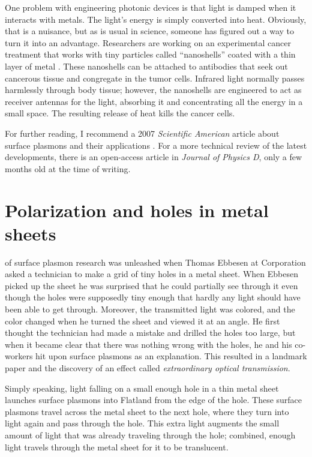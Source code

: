 One problem with engineering photonic devices is that light is damped when it interacts with metals.
The light's energy is simply converted into heat.
Obviously, that is a nuisance, but as is usual in science, someone has figured out a way to turn it into an advantage.
Researchers are working on an experimental cancer treatment that works with tiny particles called ``nanoshells'' coated with a thin layer of metal \cite{Loo2005}.
These nanoshells can be attached to antibodies that seek out cancerous tissue and congregate in the tumor cells.
Infrared light normally passes harmlessly through body tissue; however, the nanoshells are engineered to act as receiver antennas for the light, absorbing it and concentrating all the energy in a small space.
The resulting release of heat kills the cancer cells.

For further reading, I recommend a 2007 \emph{Scientific American} article about surface plasmons and their applications \cite{Atwater2007}. For a more technical review of the latest developments, there is an open-access article in \emph{Journal of Physics D}\cite{Hayashi2012}, only a few months old at the time of writing.

\section*{Polarization and holes in metal sheets}

 of surface plasmon research was unleashed when Thomas Ebbesen at  Corporation asked a technician to make a grid of tiny holes in a metal sheet.
When Ebbesen picked up the sheet he was surprised that he could partially see through it even though the holes were supposedly tiny enough that hardly any light should have been able to get through.
Moreover, the transmitted light was colored, and the color changed when he turned the sheet and viewed it at an angle.
He first thought the technician had made a mistake and drilled the holes too large, but when it became clear that there was nothing wrong with the holes, he and his co-workers hit upon surface plasmons as an explanation.
This resulted in a landmark paper \cite{Ebbesen1998} and the discovery of an effect called \emph{extraordinary optical transmission}.

Simply speaking, light falling on a small enough hole in a thin metal sheet launches surface plasmons into Flatland from the edge of the hole.
These surface plasmons travel across the metal sheet to the next hole, where they turn into light again and pass through the hole.
This extra light augments the small amount of light that was already traveling through the hole; combined, enough light travels through the metal sheet for it to be translucent.

